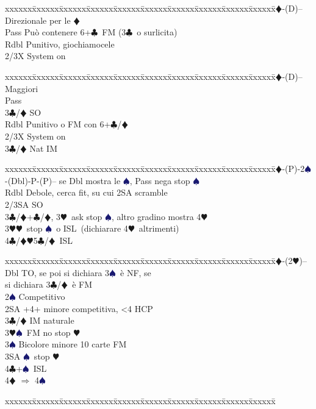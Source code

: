 \documentclass[a4paper,italian]{article}
\newcommand{\BC}{\textcolor{OliveGreen}{$\clubsuit$}}
\newcommand{\BD}{\textcolor{RedOrange}{$\vardiamondsuit$}}
\newcommand{\BH}{\textcolor{Red2}{$\varheartsuit${}}}
\newcommand{\BS}{\textcolor{MidnightBlue}{$\spadesuit${}}}
\newenvironment{bidtable}
{\begin{tabbing}

    xxxxxx\=xxxxxx\=xxxxxx\=xxxxxx\=xxxxxx\=xxxxxx\=xxxxxx\=xxxxxx\=xxxxxx\=xxxxxx\=\kill}
{\end{tabbing} }%
\begin{document}
\begin{multicols}{2}
    \begin{bidtable}
        2\BD-(D)-- \>\> Direzionale per le \BD \+\\
        Pass \> Può contenere 6+\BC\ FM (3\BC\ o surlicita)\\
        Rdbl \> Punitivo, giochiamocele\\
        2/3X \> System on
    \end{bidtable}
    \begin{bidtable}
        2\BD-(D)-- \>\> Maggiori\+\\
        Pass\+\\
        3\BC/\BD \> SO\-\\
        Rdbl \> Punitivo o FM con 6+\BC /\BD \\
        2/3X \> System on\\
        3\BC/\BD \> Nat IM\-
    \end{bidtable}
    \begin{bidtable}
        2\BD-(P)-2\BS-(Dbl)-P-(P)-- se Dbl mostra le \BS, Pass nega stop \BS\+\\
        Rdbl \> Debole, cerca fit, su cui 2SA scramble\\
        2/3SA \> SO\\
        3\BC/\BD {}+\BC/\BD, 3\BH\ ask stop \BS, altro gradino mostra 4\BH\\
        3\BH {}\BH\ stop \BS\ o ISL\ (dichiarare 4\BH\ altrimenti)\\
        4\BC/\BD {}\BH5\BC/\BD\ ISL
    \end{bidtable}
    \begin{bidtable}
        2\BD-(2\BH)--\+\\
        Dbl \> TO, se poi si dichiara 3\BS\ è NF, se\+\\\-si dichiara 3\BC/\BD\ è FM\\
        2\BS \> Competitivo\\
        2SA +4+ minore competitiva, <4 HCP\\
        3\BC/\BD \> IM naturale\\
        3\BH {}\BS\ FM no stop \BH \\
        3\BS \> Bicolore minore 10 carte FM\\
        3SA \BS\ stop \BH \\
        4\BC {}+\BS\ ISL\\
        4\BD \> $\Rightarrow$ 4\BS \-
    \end{bidtable}
    \begin{bidtable}

\end{bidtable}
\end{multicols}
\end{document}

